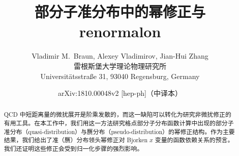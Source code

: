 \documentclass[11pt]{ctexart}
\title{部分子准分布中的幂修正与 renormalon}
\author{Vladimir M.\ Braun, Alexey Vladimirov, Jian-Hui Zhang\\[4pt]
\normalsize 雷根斯堡大学理论物理研究所\\
\normalsize Universit\"atsstra\ss{}e 31, 93040 Regensburg, Germany}
\date{arXiv:1810.00048v2 [hep-ph]\quad（中译本）}
\begin{document}
\allowdisplaybreaks
\maketitle

\begin{abstract}
QCD 中短距离量的微扰展开是阶乘发散的，而这一缺陷可以转化为研究非微扰修正的有用工具。在本工作中，我们用这一方法研究格点部分子分布函数计算中出现的部分子准分布（quasi-distribution）与赝分布（pseudo-distribution）的幂修正结构。作为主要结果，我们给出了准（赝）分布领头幂修正对 Bjorken $x$ 变量的函数依赖关系的预言。我们还证明这些修正会受到归一化步骤的强烈影响。
\end{abstract}







\end{document}

